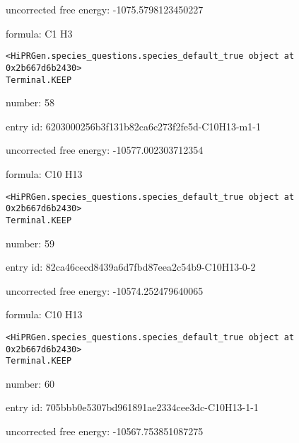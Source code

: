 \documentclass{article}
\begin{document}
uncorrected free energy: -1075.5798123450227



formula: C1 H3


\vspace{1cm}
\begin{verbatim}
<HiPRGen.species_questions.species_default_true object at 0x2b667d6b2430>
Terminal.KEEP
\end{verbatim}


number: 58



entry id: 6203000256b3f131b82ca6c273f2fe5d-C10H13-m1-1



uncorrected free energy: -10577.002303712354



formula: C10 H13


\vspace{1cm}
\begin{verbatim}
<HiPRGen.species_questions.species_default_true object at 0x2b667d6b2430>
Terminal.KEEP
\end{verbatim}


number: 59



entry id: 82ca46cecd8439a6d7fbd87eea2c54b9-C10H13-0-2



uncorrected free energy: -10574.252479640065



formula: C10 H13


\vspace{1cm}
\begin{verbatim}
<HiPRGen.species_questions.species_default_true object at 0x2b667d6b2430>
Terminal.KEEP
\end{verbatim}


number: 60



entry id: 705bbb0e5307bd961891ae2334cee3dc-C10H13-1-1



uncorrected free energy: -10567.753851087275
\end{document}
